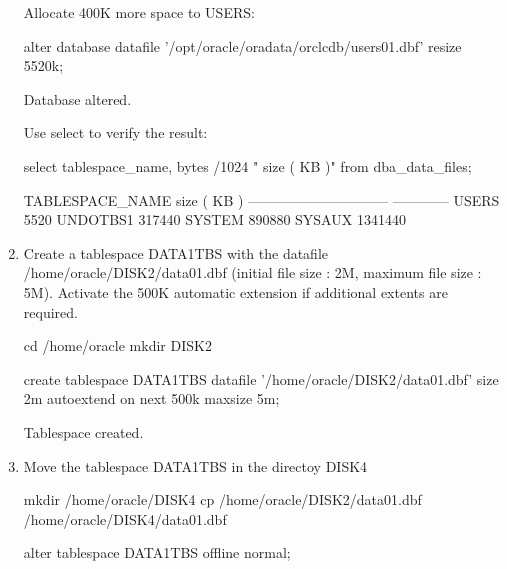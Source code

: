 \documentclass{article}
\begin{document}
\begin{enumerate}
\begin{messageshell}
\end{messageshell}

Allocate 400K more space to USERS:
\begin{sqlshell}
alter database datafile '/opt/oracle/oradata/orclcdb/users01.dbf' resize 5520k;
\end{sqlshell}
\begin{messageshell}

Database altered.

\end{messageshell}

Use select to verify the result:
\begin{sqlshell}
select tablespace_name, bytes /1024  " size ( KB )" from dba_data_files; %
\end{sqlshell}
\begin{messageshell}
TABLESPACE_NAME         size ( KB )
------------------------------ ------------
USERS                       5520
UNDOTBS1                 317440
SYSTEM                     890880
SYSAUX                    1341440

\end{messageshell}

\item{Create a tablespace DATA1TBS with the datafile /home/oracle/DISK2/data01.dbf (initial file size : 2M, maximum file size : 5M). Activate the 500K automatic extension if additional extents are required.}
\begin{commandshell}
cd /home/oracle 
mkdir DISK2
\end{commandshell}
\begin{sqlshell}
create tablespace DATA1TBS datafile '/home/oracle/DISK2/data01.dbf' size 2m autoextend on next 500k maxsize 5m;
\end{sqlshell}
\begin{messageshell}

Tablespace created.

\end{messageshell}

\item{Move the tablespace DATA1TBS in the directoy DISK4 }
\begin{commandshell}
mkdir /home/oracle/DISK4
cp /home/oracle/DISK2/data01.dbf /home/oracle/DISK4/data01.dbf
\end{commandshell}
\begin{sqlshell}
alter tablespace DATA1TBS offline normal;
\end{sqlshell}
\begin{messageshell}


\end{messageshell}
\end{enumerate}
\end{document}
